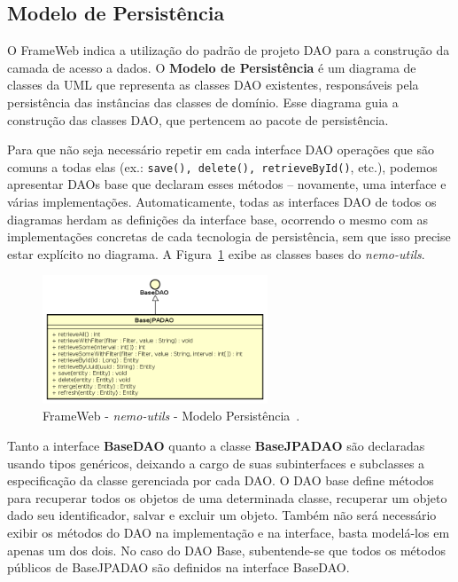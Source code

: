 \newpage
\subsection{Modelo de Persistência}

O FrameWeb indica a utilização do padrão de projeto DAO para a construção da camada de acesso a dados. O \textbf{Modelo de Persistência} é um diagrama de classes da UML que representa as classes DAO existentes, responsáveis pela persistência das instâncias das classes de domínio. Esse diagrama guia a construção das classes DAO, que pertencem ao pacote de persistência.


Para que não seja necessário repetir em cada interface DAO operações que são comuns a todas elas (ex.: \texttt{save(), delete(), retrieveById()}, etc.), podemos apresentar DAOs base que declaram esses métodos – novamente, uma interface e várias implementações. Automaticamente, todas as interfaces DAO de todos os diagramas herdam as definições da interface base, ocorrendo o mesmo com as implementações concretas de cada tecnologia de persistência, sem que isso precise estar explícito no diagrama. A Figura~\ref{fig-projeto-nemo-utils-modelo-persistencia} exibe as classes bases do \textit{nemo-utils}.

\begin{figure}[h]
	\centering
	\includegraphics[width=0.6\textwidth]{figuras/projeto/fig-projeto-nemo-utils-modelo-persistencia}
	\caption{FrameWeb - \textit{nemo-utils} - Modelo Persistência~\cite{lima-pg15}.}
	\label{fig-projeto-nemo-utils-modelo-persistencia}
\end{figure}

Tanto a interface \textbf{BaseDAO} quanto a classe \textbf{BaseJPADAO} são declaradas usando tipos genéricos, deixando a cargo de suas subinterfaces e subclasses a especificação da classe gerenciada por cada DAO. O DAO base define métodos para recuperar todos os objetos de uma determinada classe, recuperar um objeto dado seu identificador, salvar e excluir um objeto. Também não será necessário exibir os métodos do DAO na implementação e na interface, basta modelá-los em apenas um dos dois. No caso do DAO Base, subentende-se que todos os métodos públicos de BaseJPADAO são definidos na interface BaseDAO.

